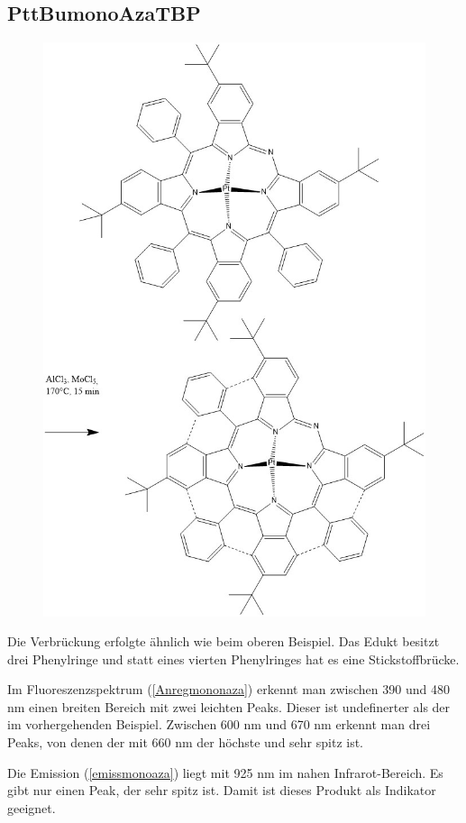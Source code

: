 \subsection{PttBumonoAzaTBP}
\begin{figure}[!htpb]
\centering
\includegraphics[scale=0.5]{graphics/PttBumonoAzaTBPreaction}
\end{figure}
Die Verbrückung erfolgte ähnlich wie beim oberen Beispiel. Das Edukt besitzt drei Phenylringe und statt eines vierten Phenylringes hat es eine Stickstoffbrücke. 

Im Fluoreszenzspektrum (\ref{Anregmononaza}) erkennt man zwischen 390 und 480 nm  einen breiten Bereich mit zwei leichten Peaks. Dieser ist undefinerter als der im vorhergehenden Beispiel. Zwischen 600 nm und 670 nm erkennt man drei Peaks, von denen der mit 660 nm der höchste und sehr spitz ist.


Die Emission (\ref{emissmonoaza}) liegt mit 925 nm im nahen Infrarot-Bereich. Es gibt nur einen Peak, der sehr spitz ist. Damit ist dieses Produkt als Indikator geeignet.